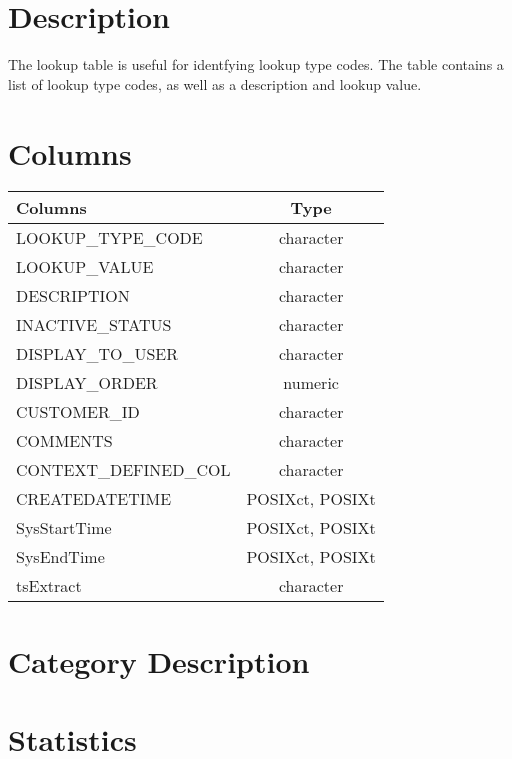 \documentclass[
  letterpaper,
  DIV=11,
  numbers=noendperiod]{scrreprt}
\begin{document}
\hypertarget{description-17}{%
\section*{Description}\label{description-17}}

The lookup table is useful for identfying lookup type codes. The table
contains a list of lookup type codes, as well as a description and
lookup value.

\hypertarget{columns-17}{%
\section*{Columns}\label{columns-17}}

\begin{longtable}{lc}
\toprule
Columns & Type \\ 
\midrule
LOOKUP\_TYPE\_CODE & character \\ 
LOOKUP\_VALUE & character \\ 
DESCRIPTION & character \\ 
INACTIVE\_STATUS & character \\ 
DISPLAY\_TO\_USER & character \\ 
DISPLAY\_ORDER & numeric \\ 
CUSTOMER\_ID & character \\ 
COMMENTS & character \\ 
CONTEXT\_DEFINED\_COL & character \\ 
CREATEDATETIME & POSIXct, POSIXt \\ 
SysStartTime & POSIXct, POSIXt \\ 
SysEndTime & POSIXct, POSIXt \\ 
tsExtract & character \\ 
\bottomrule
\end{longtable}

\hypertarget{category-description-17}{%
\section*{Category Description}\label{category-description-17}}

\hypertarget{statistics-17}{%
\section*{Statistics}\label{statistics-17}}
\end{document}
